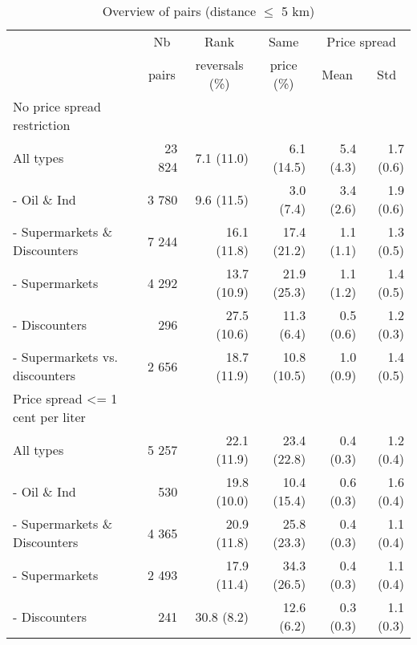 \documentclass[english]{article}
\begin{document}
\begin{table}[H]
\begin{threeparttable}
\renewcommand{\arraystretch}{0.8} %
\caption{Overview of pairs (distance $\le$ 5 km)}
\label{tab:stats_pair_rank_reversals}
    \begin{tabular}{lrrrrr}
    \toprule
    \toprule
          & \multicolumn{1}{c}{Nb} & \multicolumn{1}{c}{Rank} & \multicolumn{1}{c}{Same} & \multicolumn{2}{c}{Price spread} \\
          & \multicolumn{1}{c}{pairs} & \multicolumn{1}{c}{reversals (\%)} & \multicolumn{1}{c}{price (\%)} & \multicolumn{1}{c}{Mean} & \multicolumn{1}{c}{Std} \\
    \midrule
    No price spread restriction &       &       &       &       &  \\
    All types & 23 824 & 7.1 (11.0) & 6.1 (14.5) & 5.4 (4.3) & 1.7 (0.6) \\
    - Oil \& Ind & 3 780 & 9.6 (11.5) & 3.0 \phantom{0}(7.4) & 3.4 (2.6) & 1.9 (0.6) \\
    - Supermarkets \& Discounters & 7 244 & 16.1 (11.8) & 17.4 (21.2) & 1.1 (1.1) & 1.3 (0.5) \\
    \hspace*{4mm} - Supermarkets & 4 292 & 13.7 (10.9) & 21.9 (25.3) & 1.1 (1.2) & 1.4 (0.5) \\
    \hspace*{4mm} -  Discounters & 296   & 27.5 (10.6) & 11.3 \phantom{0}(6.4) & 0.5 (0.6) & 1.2 (0.3) \\
    \hspace*{4mm} -  Supermarkets vs. discounters & 2 656 & 18.7 (11.9) & 10.8 (10.5) & 1.0 (0.9) & 1.4 (0.5) \\
    \midrule
    Price spread <= 1 cent per liter &       &       &       &       &  \\
    All types & 5 257 & 22.1 (11.9) & 23.4 (22.8) & 0.4 (0.3) & 1.2 (0.4) \\
    - Oil \& Ind & 530   & 19.8 (10.0) & 10.4 (15.4) & 0.6 (0.3) & 1.6 (0.4) \\
    - Supermarkets \& Discounters & 4 365 & 20.9 (11.8) & 25.8 (23.3) & 0.4 (0.3) & 1.1 (0.4) \\
    \hspace*{4mm} - Supermarkets & 2 493 & 17.9 (11.4) & 34.3 (26.5) & 0.4 (0.3) & 1.1 (0.4) \\
    \hspace*{4mm} - Discounters & 241   & 30.8 \phantom{0}(8.2) & 12.6 \phantom{0}(6.2) & 0.3 (0.3) & 1.1 (0.3) \\

\end{tabular}
\end{threeparttable}
\end{table}
\end{document}
